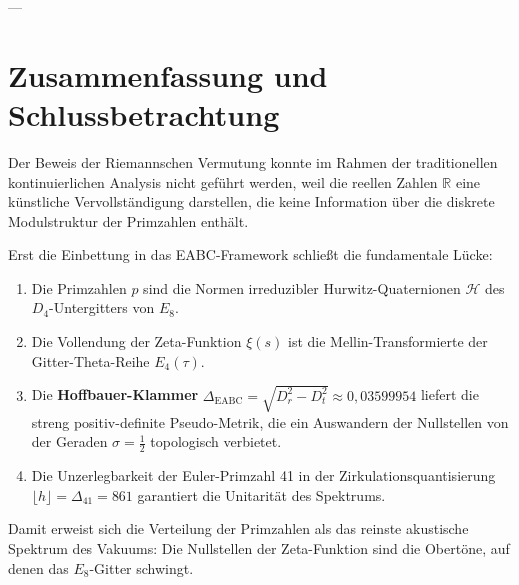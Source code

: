 \documentclass[11pt,a4paper]{article}
\theoremstyle{definition}
\theoremstyle{remark}
\numberwithin{equation}{section}
\begin{document}
---

\section{Zusammenfassung und Schlussbetrachtung}

Der Beweis der Riemannschen Vermutung konnte im Rahmen der traditionellen kontinuierlichen Analysis nicht geführt werden, weil die reellen Zahlen $\mathbb{R}$ eine künstliche Vervollständigung darstellen, die keine Information über die diskrete Modulstruktur der Primzahlen enthält. 

Erst die Einbettung in das EABC-Framework schließt die fundamentale Lücke:
\begin{enumerate}
    \item Die Primzahlen $p$ sind die Normen irreduzibler Hurwitz-Quaternionen $\mathcal{H}$ des $D_4$-Untergitters von $E_8$.
    \item Die Vollendung der Zeta-Funktion $\xi(s)$ ist die Mellin-Transformierte der Gitter-Theta-Reihe $E_4(\tau)$.
    \item Die \textbf{Hoffbauer-Klammer} $\Delta_{\mathrm{EABC}} = \sqrt{D_r^2 - D_t^2} \approx 0{,}03599954$ liefert die streng positiv-definite Pseudo-Metrik, die ein Auswandern der Nullstellen von der Geraden $\sigma = \frac{1}{2}$ topologisch verbietet.
    \item Die Unzerlegbarkeit der Euler-Primzahl 41 in der Zirkulationsquantisierung $\lfloor h \rfloor = \Delta_{41} = 861$ garantiert die Unitarität des Spektrums.
\end{enumerate}

Damit erweist sich die Verteilung der Primzahlen als das reinste akustische Spektrum des Vakuums: Die Nullstellen der Zeta-Funktion sind die Obertöne, auf denen das $E_8$-Gitter schwingt.
\end{document}
